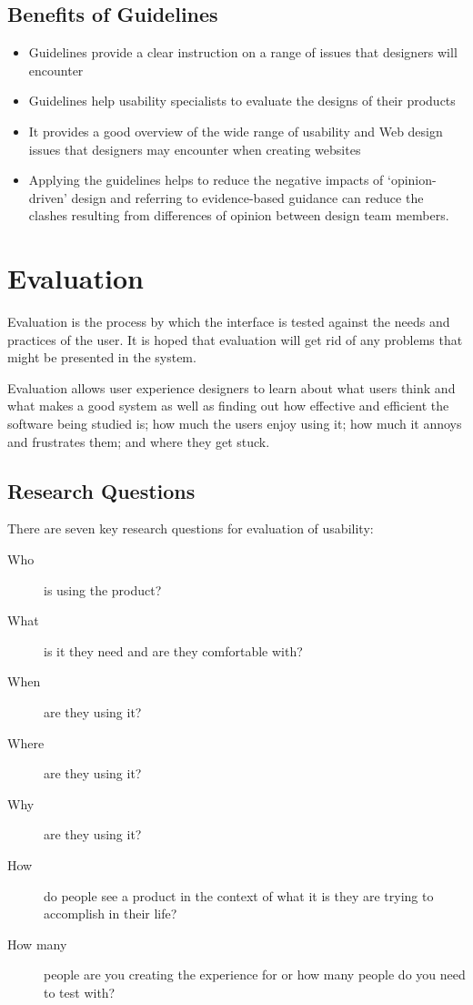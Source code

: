 \subsection{Benefits of Guidelines}
\begin{itemize}
    \item Guidelines provide a clear instruction on a range of issues that designers will encounter
    \item Guidelines help usability specialists to evaluate the designs of their products
    \item It provides a good overview of the wide range of usability and Web design issues that designers may encounter when creating websites
    \item Applying the guidelines helps to reduce the negative impacts of `opinion-driven' design and referring to evidence-based guidance can reduce the clashes resulting from differences of opinion between design team members. 
\end{itemize}

\section{Evaluation}
Evaluation is the process by which the interface is tested against the needs and practices of the user. It is hoped that evaluation will get rid of any problems that might be presented in the system.

Evaluation allows user experience designers to learn about what users think and what makes a good system as well as finding out how effective and efficient the software being studied is; how much the users enjoy using it; how much it annoys and frustrates them; and where they get stuck. 

\subsection{Research Questions}
There are seven key research questions for evaluation of usability:
\begin{description}
    \item[Who] is using the product?
    \item[What] is it they need and are they comfortable with?
    \item[When] are they using it?
    \item[Where] are they using it?
    \item[Why] are they using it?
    \item[How] do people see a product in the context of what it is they are trying to accomplish in their life?
    \item[How many] people are you creating the experience for or how many people do you need to test with?
\end{description} 

